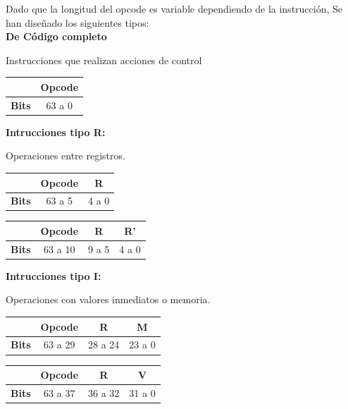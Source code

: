 \documentclass{article}
\begin{document}
Dado que la longitud del opcode
es variable dependiendo de la instrucción,
Se han diseñado los siguientes tipos:\\

\textbf{De Código completo}

Instrucciones que realizan acciones de control

\begin{table}[H]
\centering
\begin{tabular}{|c|c|}
\hline
 & \textbf{Opcode} \\ \hline
\textbf{Bits} & 63 a 0 \\
\hline
\end{tabular}
\end{table}

\textbf{Intrucciones tipo R:}

Operaciones entre registros.

\begin{table}[H]
\centering
\begin{tabular}{|c|c|c|}
\hline
 & \textbf{Opcode} & \textbf{R}  \\ \hline
\textbf{Bits} &63 a 5 & 4 a 0 \\
\hline
\end{tabular}
\end{table}

\begin{table}[H]
\centering
\begin{tabular}{|c|c|c|c|}
\hline
 & \textbf{Opcode} & \textbf{R} & \textbf{R'} \\ \hline
\textbf{Bits} &63 a 10 & 9 a 5 & 4 a 0 \\
\hline
\end{tabular}
\end{table}


\textbf{Intrucciones tipo I:}

Operaciones con valores inmediatos o memoria.

\begin{table}[H]
\centering
\begin{tabular}{|c|c|c|c|}
\hline
 & \textbf{Opcode} & \textbf{R} & \textbf{M} \\ \hline
\textbf{Bits} &63 a 29 & 28 a 24 & 23 a 0 \\
\hline
\end{tabular}
\end{table}

\begin{table}[H]
\centering
\begin{tabular}{|c|c|c|c|}
\hline
 & \textbf{Opcode} & \textbf{R} & \textbf{V} \\ \hline
\textbf{Bits} &63 a 37 & 36 a 32 & 31 a 0 \\
\hline
\end{tabular}
\end{table}
\end{document}

